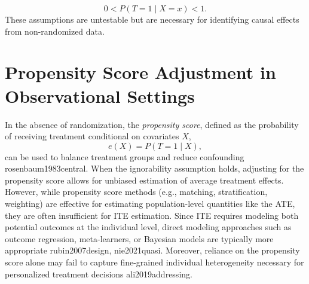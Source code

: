 \begin{equation}
0 < P(T = 1 \mid X = x) < 1.
\end{equation}
These assumptions are untestable but are necessary for identifying causal effects from non-randomized data.

\section{Propensity Score Adjustment in Observational Settings}

In the absence of randomization, the \textit{propensity score}, defined as the probability of receiving treatment conditional on covariates $X$,
\begin{equation}
e(X) = P(T = 1 \mid X),
\end{equation}
can be used to balance treatment groups and reduce confounding rosenbaum1983central. When the ignorability assumption holds, adjusting for the propensity score allows for unbiased estimation of average treatment effects. However, while propensity score methods (e.g., matching, stratification, weighting) are effective for estimating population-level quantities like the ATE, they are often insufficient for ITE estimation. Since ITE requires modeling both potential outcomes at the individual level, direct modeling approaches such as outcome regression, meta-learners, or Bayesian models are typically more appropriate rubin2007design, nie2021quasi. Moreover, reliance on the propensity score alone may fail to capture fine-grained individual heterogeneity necessary for personalized treatment decisions ali2019addressing.



